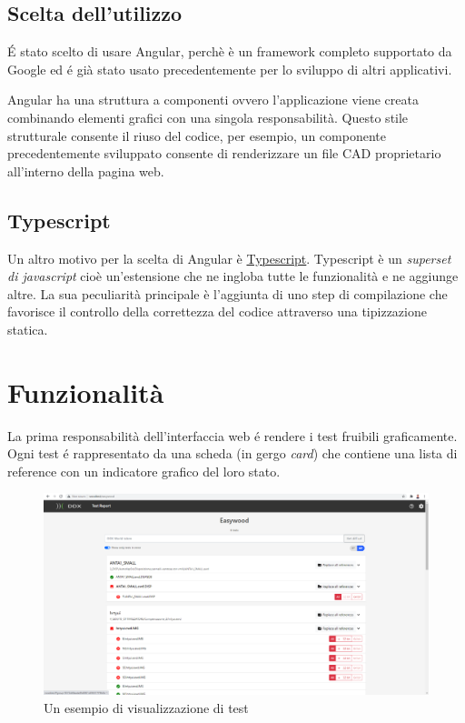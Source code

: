         \subsection{Scelta dell'utilizzo}
            \'E stato scelto di usare Angular, perchè è un framework completo supportato da Google
            ed \'e già stato usato precedentemente per lo sviluppo di altri applicativi.
            
            Angular ha una struttura a componenti ovvero l'applicazione viene creata combinando elementi grafici con una singola responsabilità.
            Questo stile strutturale consente il riuso del codice, per esempio, un componente precedentemente sviluppato consente
            di renderizzare un file CAD proprietario all'interno della pagina web.
        
        \subsection{Typescript}
            Un altro motivo per la scelta di Angular è \href{https://www.typescriptlang.org}{Typescript}.
            Typescript è un \textit{superset di javascript} cioè un'estensione che ne ingloba tutte le funzionalità e ne aggiunge altre.
            La sua peculiarità principale è l'aggiunta di uno step di compilazione che favorisce il controllo della correttezza del codice attraverso una tipizzazione statica.
    \section{Funzionalità}
        La prima responsabilità dell'interfaccia web \'e rendere i test fruibili graficamente.
        Ogni test \'e rappresentato da una scheda (in gergo \textit{card}) che contiene una lista di reference con un indicatore grafico del loro stato.
        \begin{figure}[h]
            \includegraphics[width=\textwidth]{images/page.png}
            \caption{Un esempio di visualizzazione di test}
        \end{figure}
